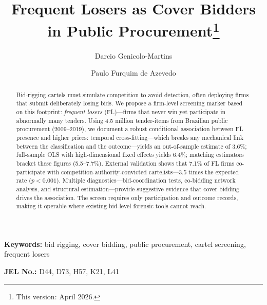 \begin{frontmatter}

\title{Frequent Losers as Cover Bidders in Public Procurement\texorpdfstring{\footnote{This version: April 2026.}}{}}

\author[insper]{Darcio Genicolo-Martins}
\author[insper]{Paulo Furquim de Azevedo}

\begin{abstract}
Bid-rigging cartels must simulate competition to avoid detection,
often deploying firms that submit deliberately losing bids. We
propose a firm-level screening marker based on this footprint:
\emph{frequent losers} (FL)---firms that never win yet participate
in abnormally many tenders. Using 4.5 million tender-items from
Brazilian public procurement (2009--2019), we document a robust
conditional association between FL presence and higher prices:
temporal cross-fitting---which breaks any mechanical link between
the classification and the outcome---yields an out-of-sample
estimate of 3.6\%; full-sample OLS with high-dimensional fixed
effects yields 6.4\%; matching estimators bracket these figures
(5.5--7.7\%). External validation
shows that 7.1\% of FL firms co-participate with
competition-authority-convicted cartelists---3.5 times the expected
rate ($p < 0.001$). Multiple diagnostics---bid-coordination tests,
co-bidding network analysis, and structural estimation---provide
suggestive evidence that cover bidding drives the association. The
screen requires only participation and outcome records, making it
operable where existing bid-level forensic tools cannot reach.
\end{abstract}

\end{frontmatter}

\noindent\textbf{Keywords:} bid rigging, cover bidding, public procurement, cartel screening, frequent losers

\noindent\textbf{JEL No.:} D44, D73, H57, K21, L41

\bigskip
